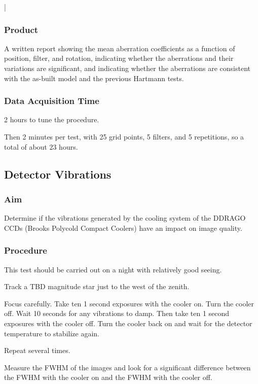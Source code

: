 |\documentclass{article}
\begin{document}
\subsubsection{Product}

A written report showing the mean aberration coefficients as a function of position, filter, and rotation, indicating  whether the aberrations and their variations are significant, and indicating whether the aberrations are consistent with the as-built model and the previous Hartmann tests.

\subsubsection{Data Acquisition Time}

2 hours to tune the procedure.

Then 2 minutes per test, with 25 grid points, 5 filters, and 5 repetitions, so a total of about 23 hours.


\subsection{Detector Vibrations}

\subsubsection{Aim}

Determine if the vibrations generated by the cooling system of the DDRAGO CCDs (Brooks Polycold Compact Coolers) have an impact on image quality. 

\subsubsection{Procedure}

This test should be carried out on a night with relatively good seeing.

Track a TBD magnitude star just to the west of the zenith.

Focus carefully. Take ten 1 second exposures with the cooler on. Turn the cooler off. Wait 10 seconds for any vibrations to damp. Then take ten 1 second exposures with the cooler off. Turn the cooler back on and wait for the detector temperature to stabilize again.

Repeat several times.

Measure the FWHM of the images and look for a significant difference between the FWHM with the cooler on and the FWHM with the cooler off.
\end{document}
